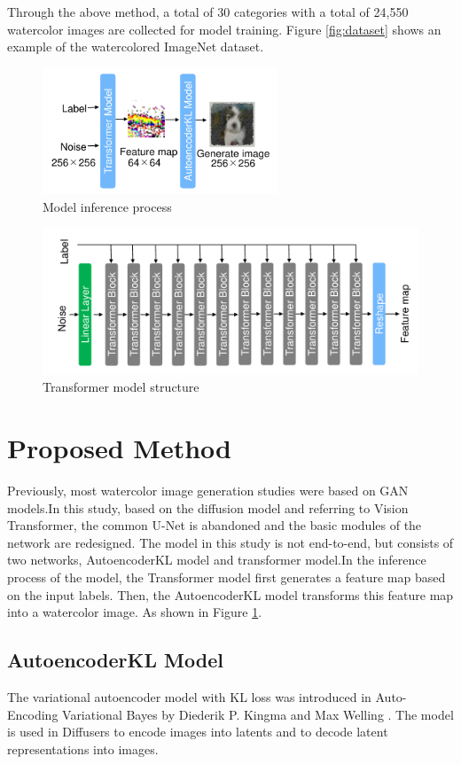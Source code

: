 \documentclass{acsman}
\begin{document}
Through the above method, a total of 30 categories with a total of 24,550 watercolor images are collected for model training. Figure \ref{fig:dataset} shows an example of the watercolored ImageNet dataset.
\begin{figure}[h]
    \centering
    \includegraphics[width=7cm]{image/pm.pdf}
    \caption{Model inference process}
    \label{fig:PM}
\end{figure}
\begin{figure}[tbp]
    \centering
    \includegraphics[width=15cm]{image/traM.pdf}
    \caption{Transformer model structure}
    \label{fig:traM}
\end{figure}
\section{Proposed Method}\label{sec:method}
Previously, most watercolor image generation studies were based on GAN models.In this study, based on the diffusion model and referring to Vision Transformer, the common U-Net is abandoned and the basic modules of the network are redesigned. The model in this study is not end-to-end, but consists of two networks, AutoencoderKL model and transformer model.In the inference process of the model, the Transformer model first generates a feature map based on the input labels. Then, the AutoencoderKL model transforms this feature map into a watercolor image. As shown in Figure \ref{fig:PM}.

\subsection{AutoencoderKL Model}
The variational autoencoder model with KL loss was introduced in Auto-Encoding Variational Bayes by Diederik P. Kingma and Max Welling \cite{kingma2013auto}. The model is used in Diffusers to encode images into latents and to decode latent representations into images.
\end{document}

